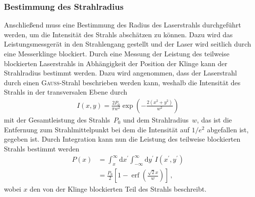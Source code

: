 \documentclass[11pt, a4paper]{article}
\numberwithin{equation}{section}
\DeclareMathOperator{\erf}{erf}
\begin{document}
\subsubsection{Bestimmung des Strahlradius}
\label{sec:strahlradius}
Anschließend muss eine Bestimmung des Radius des Laserstrahls durchgeführt werden, um die Intensität des Strahls abschätzen zu können.
Dazu wird das Leistungsmessgerät in den Strahlengang gestellt und der Laser wird seitlich durch eine Messerklinge blockiert.
Durch eine Messung der Leistung des teilweise blockierten Laserstrahls in Abhängigkeit der Position der Klinge kann der Strahlradius bestimmt werden.
Dazu wird angenommen, dass der Laserstrahl durch einen \textsc{Gauß}-Strahl beschrieben werden kann, weshalb die Intensität des Strahls in der transversalen Ebene durch
\begin{align*}
	I(x, y) = \frac{2 P_0}{\pi w^2} \exp\left(-\frac{2 (x^2 + y^2)}{w^2} \right)
\end{align*}
mit der Gesamtleistung des Strahls~$P_0$ und dem Strahlradius~$w$, das ist die Entfernung zum Strahlmittelpunkt bei dem die Intensität auf $1/e^2$ abgefallen ist, gegeben ist.
Durch Integration kann nun die Leistung des teilweise blockierten Strahls bestimmt werden
\begin{align}
	P(x) &= \int_{x}^{\infty} \mathrm{d}x^\prime \int_{-\infty}^{\infty} \mathrm{d}y^\prime \, I(x^\prime, y^\prime) \nonumber \\
	     &= \frac{P_0}{2} \left[ 1 - \erf\left( \frac{\sqrt{2} x}{w}\right) \right] \, \text{,}
	\label{eq:erf_fit}
\end{align}
wobei $x$ den von der Klinge blockierten Teil des Strahls beschreibt.
\end{document}
